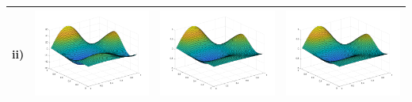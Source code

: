\documentclass[11pt]{article}
\theoremstyle{definition}
\theoremstyle{remark}
\theoremstyle{plain}
\begin{document}
\begin{center}
\begin{tabular}{|>{\centering\arraybackslash}r|m{4.3cm}|m{4.3cm}|m{4.3cm}|}
    ii)&\includegraphics[width=\linewidth]{../Figures/poisson_rhs_2.png}&\includegraphics[width=\linewidth]{../Figures/poisson_actual_2.png}&\includegraphics[width=\linewidth]{../Figures/poisson_approx_2.png}\\\hline

\end{tabular}
\end{center}
\end{document}

